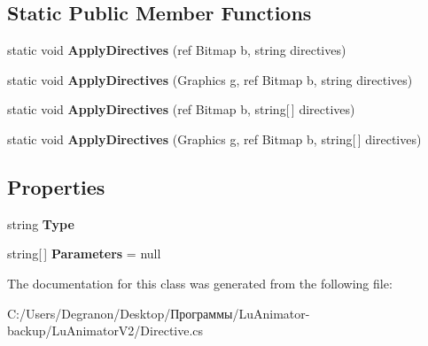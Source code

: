 \subsection*{Static Public Member Functions}
\begin{DoxyCompactItemize}
\item 
static void {\bfseries Apply\+Directives} (ref Bitmap b, string directives)\hypertarget{class_star_cheat_reloaded_1_1_g_u_i_1_1_directive_a7331903b152cd55abda0961aabefbf91}{}\label{class_star_cheat_reloaded_1_1_g_u_i_1_1_directive_a7331903b152cd55abda0961aabefbf91}

\item 
static void {\bfseries Apply\+Directives} (Graphics g, ref Bitmap b, string directives)\hypertarget{class_star_cheat_reloaded_1_1_g_u_i_1_1_directive_a5a91ea5df9d586890808cbc6412becbc}{}\label{class_star_cheat_reloaded_1_1_g_u_i_1_1_directive_a5a91ea5df9d586890808cbc6412becbc}

\item 
static void {\bfseries Apply\+Directives} (ref Bitmap b, string\mbox{[}$\,$\mbox{]} directives)\hypertarget{class_star_cheat_reloaded_1_1_g_u_i_1_1_directive_a2bead4c75d80d3fafb41e4c336f7cae6}{}\label{class_star_cheat_reloaded_1_1_g_u_i_1_1_directive_a2bead4c75d80d3fafb41e4c336f7cae6}

\item 
static void {\bfseries Apply\+Directives} (Graphics g, ref Bitmap b, string\mbox{[}$\,$\mbox{]} directives)\hypertarget{class_star_cheat_reloaded_1_1_g_u_i_1_1_directive_aa03b3c725f03f3649922d87b07127acb}{}\label{class_star_cheat_reloaded_1_1_g_u_i_1_1_directive_aa03b3c725f03f3649922d87b07127acb}

\end{DoxyCompactItemize}
\subsection*{Properties}
\begin{DoxyCompactItemize}
\item 
string {\bfseries Type}\hypertarget{class_star_cheat_reloaded_1_1_g_u_i_1_1_directive_a4f235e66648a94f42739b8723324e942}{}\label{class_star_cheat_reloaded_1_1_g_u_i_1_1_directive_a4f235e66648a94f42739b8723324e942}

\item 
string\mbox{[}$\,$\mbox{]} {\bfseries Parameters} = null\hypertarget{class_star_cheat_reloaded_1_1_g_u_i_1_1_directive_a04b3d2d22a2450471b78564c7e874a90}{}\label{class_star_cheat_reloaded_1_1_g_u_i_1_1_directive_a04b3d2d22a2450471b78564c7e874a90}

\end{DoxyCompactItemize}


The documentation for this class was generated from the following file\+:\begin{DoxyCompactItemize}
\item 
C\+:/\+Users/\+Degranon/\+Desktop/Программы/\+Lu\+Animator-\/backup/\+Lu\+Animator\+V2/Directive.\+cs\end{DoxyCompactItemize}
